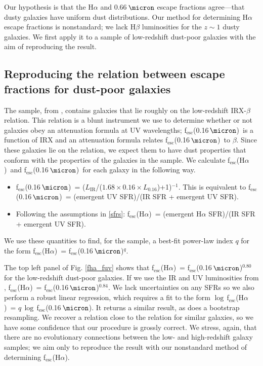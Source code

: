 \documentclass[preprint]{aastex}
\newcommand{\alephuv}{f$_{\mathrm{esc}}$(0.16$\,\micron$)}
\newcommand{\alephha}{f$_{\mathrm{esc}}$(H$\alpha$)}
\newcommand{\alephuvha}{f$_{\mathrm{esc}}$(0.66$\,\micron$)}
\begin{document}
Our hypothesis is that the H$\alpha$ and 0.66$\,\micron$ escape fractions
agree---that dusty galaxies have uniform dust distributions.
Our method for determining H$\alpha$ escape fractions is nonstandard; we lack
H$\beta$ luminosities for the $z \sim 1$ dusty galaxies.  We first apply
it to a sample of low-redshift dust-poor galaxies with the aim of reproducing
the \citet{calzetti97b} result.

\subsection{Reproducing the relation between escape fractions for dust-poor
galaxies}

The sample, from \citet{overzier11}, contains galaxies that lie roughly on
the low-redshift IRX-$\beta$ relation.  This relation is a blunt instrument we
use to determine whether or not galaxies obey an attenuation formula at UV
wavelengths; \alephuv~is a function of IRX and an attenuation formula relates
\alephuv~to $\beta$.  Since these galaxies lie on the relation, we
expect them to have dust properties that conform with the properties of
the galaxies in the \citet{calzetti00} sample.  We calculate \alephha~and
\alephuv~for each galaxy in the following way.
\begin{itemize}
\item \alephuv~= ($L_{\mathrm{IR}}$/($1.68\times0.16\times
L_{\mathrm{0.16}}$)+1)$^{-1}$.  This is equivalent to \alephuv~= (emergent UV
SFR)/(IR SFR + emergent UV SFR).
\item Following the assumptions in \ref{sfrs}: \alephha~=
(emergent H$\alpha$ SFR)/(IR SFR + emergent UV SFR).
\end{itemize}
We use these quantities to find, for the sample, a best-fit power-law index $q$
for the form \alephha~= \alephuv$^{q}$.

The top left panel of Fig. \ref{fha_fuv} shows that \alephha~= \alephuv$^{0.80}$
for the low-redshift
dust-poor galaxies.  If we use the IR and UV luminosities from
\citealt{overzier11}, \alephha~= \alephuv$^{0.84}$.  We lack
uncertainties on any SFRs so we also perform a robust linear regression,
which requires a fit to the form $\log\,$\alephha~= $q\,\log\,$\alephuv.  It
returns a similar result, as does a bootstrap resampling.  We recover a relation
close to the
\citet{calzetti97b} relation for similar galaxies, so we have some confidence
that our procedure is grossly correct.  We stress, again, that there are
no evolutionary connections between the low- and high-redshift galaxy samples;
we aim only to reproduce the \citet{calzetti97b} result with our nonstandard
method of determining \alephha.
\end{document}
